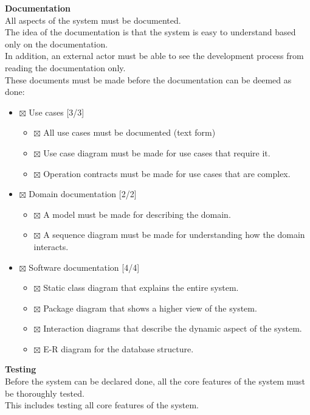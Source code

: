 \documentclass[11pt]{article}
\begin{document}
\textbf{Documentation} \\
\label{sec-5-1-1-2}%
All aspects of the system must be documented. \\
The idea of the documentation is that the system is easy to understand based only on the documentation. \\
In addition, an external actor must be able to see the development
process from reading the documentation only. \\

These documents must be made before the documentation can be deemed as done:
\begin{itemize}
\item $\boxtimes$ Use cases [3/3]
\begin{itemize}
\item $\boxtimes$ All use cases must be documented (text form)
\item $\boxtimes$ Use case diagram must be made for use cases that require it.
\item $\boxtimes$ Operation contracts must be made for use cases that are complex.
\end{itemize}
\item $\boxtimes$ Domain documentation [2/2]
\begin{itemize}
\item $\boxtimes$ A model must be made for describing the domain.
\item $\boxtimes$ A sequence diagram must be made for understanding how the domain interacts.
\end{itemize}
\item $\boxtimes$ Software documentation [4/4]
\begin{itemize}
\item $\boxtimes$ Static class diagram that explains the entire system.
\item $\boxtimes$ Package diagram that shows a higher view of the system.
\item $\boxtimes$ Interaction diagrams that describe the dynamic aspect of the system.
\item $\boxtimes$ E-R diagram for the database structure.
\end{itemize}
\end{itemize}

\textbf{Testing} \\
\label{sec-5-1-1-3}%
Before the system can be declared done, all the core features of the system
must be thoroughly tested.\\
This includes testing all core features of the system. \\
\end{document}
